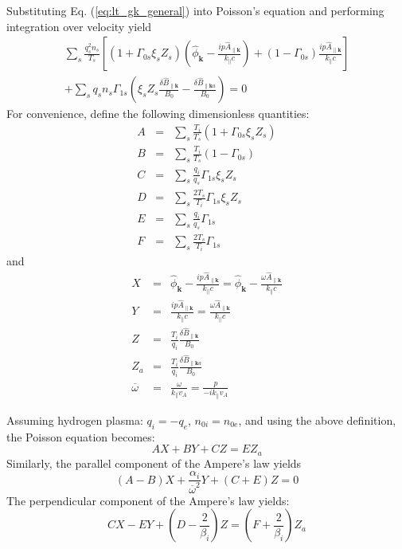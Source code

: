\documentclass[12pt]{article}
\begin{document}
Substituting Eq. (\ref{eq:lt_gk_general}) into Poisson's equation and performing integration over velocity yield
%
\begin{equation}
\begin{split}
\sum_s \frac{q_s^2 n_s}{T_s} \left[ ( 1 + \Gamma_{0s}\xi_s Z_s)\left(\hat{\phi}_{\mathbf{k}} - \frac{ip\hat{A}_{\parallel\mathbf{k}}}{k_\parallel c}\right) + (1-\Gamma_{0s}) \frac{ip\hat{A}_{\parallel\mathbf{k}}}{k_\parallel c}\right] \\
 + \sum_s q_s n_s \Gamma_{1s}\left( \xi_s Z_s \frac{\delta \hat{B}_{\parallel \mathbf{k}}}{B_0} - \frac{\delta \hat{B}_{\parallel \mathbf{k} a}}{B_0}\right) = 0
\end{split}
\end{equation}
For convenience, define the following dimensionless quantities:
%
\begin{eqnarray}
A &=& \sum_s \frac{T_i}{T_s} (1 + \Gamma_{0s}\xi_s Z_s) \\
B &=& \sum_s \frac{T_i}{T_s} (1 - \Gamma_{0s}) \\
C &=& \sum_s \frac{q_i}{q_s} \Gamma_{1s} \xi_s Z_s \\
D &=& \sum_s \frac{2T_s}{T_i}\Gamma_{1s} \xi_s Z_s \\
E &=& \sum_s \frac{q_i}{q_s} \Gamma_{1s} \\
F &=& \sum_s \frac{2T_s}{T_i} \Gamma_{1s}
\end{eqnarray}
%
and
\begin{eqnarray}
X &=& \hat{\phi}_{\mathbf{k}} - \frac{ip\hat{A}_{\parallel \mathbf{k}}}{k_\parallel c} = \hat{\phi}_{\mathbf{k}} - \frac{\omega\hat{A}_{\parallel \mathbf{k}}}{k_\parallel c} \\
Y &=& \frac{ip\hat{A}_{\parallel \mathbf{k}}}{k_\parallel c} = \frac{\omega\hat{A}_{\parallel \mathbf{k}}}{k_\parallel c} \\
Z &=& \frac{T_i}{q_i} \frac{\delta \hat{B}_{\parallel \mathbf{k}}}{B_0} \\
Z_a &=& \frac{T_i}{q_i} \frac{\delta \hat{B}_{\parallel \mathbf{k}a}}{B_0} \\
\overline{\omega} &=& \frac{\omega}{k_\parallel v_A} = \frac{p}{-ik_\parallel v_A}
\end{eqnarray}

Assuming hydrogen plasma: $q_i = -q_e$, $n_{0i}=n_{0e}$, and using the above definition, the Poisson equation becomes:
%
\begin{equation}
A X + B Y + CZ = E Z_a
\end{equation}
Similarly, the parallel component of the Ampere's law yields
%
\begin{equation}
(A-B) X + \frac{\alpha_i}{\overline{\omega}^2} Y + (C+E) Z = 0
\end{equation}
The perpendicular component of the Ampere's law yields: 
%
\begin{equation}
C X - E Y + \left(D-\frac{2}{\beta_i}\right) Z = \left(F + \frac{2}{\beta_i}\right) Z_a
\end{equation}
\end{document}
